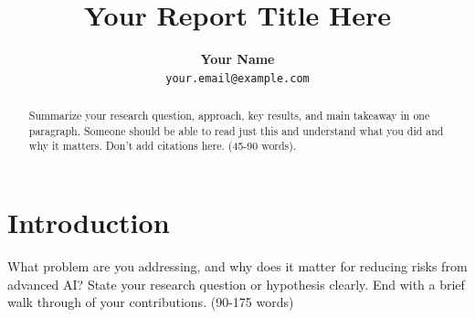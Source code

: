 \documentclass[midterm]{sparreport}
\title{Your Report Title Here}
\author{
  \textbf{Your Name}\\
  \texttt{your.email@example.com}
}
\begin{document}
\maketitle

\begin{abstract}
Summarize your research question, approach, key results, and main takeaway in one paragraph. Someone should be able to read just this and understand what you did and why it matters. Don’t add citations here. (45-90 words).
\end{abstract}


\section{Introduction}

What problem are you addressing, and why does it matter for reducing risks from advanced AI? State your research question or hypothesis clearly. End with a brief walk through of your contributions. (90-175 words)


\end{document}
